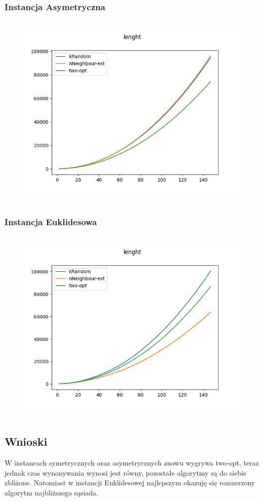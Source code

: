 \documentclass[11pt]{article}
\begin{document}
\subsubsection{Instancja Asymetryczna }
            \begin{center}
            \begin{figure}[H]

                \\ \includegraphics[scale=0.6]{images/lenght_asym_time.png}\

            \end{figure}
            \end{center}
\subsubsection{Instancja Euklidesowa }
            \begin{center}
            \begin{figure}[H]

                \\ \includegraphics[scale=0.6]{images/lenght_euc_time.png}\

            \end{figure}
            \end{center}
\subsection{Wnioski }
W instancach symetrycznych oraz asymetrycznych znowu wygrywa two-opt, teraz jednak czas wynonywania wynosi jest równy, pozostałe algorytmy są do siebie zbliżone. Natomiast w instancji Euklidesowej najlepszym okazuję się rozszerzony algorytm najbliższego sąsiada.
\end{document}
